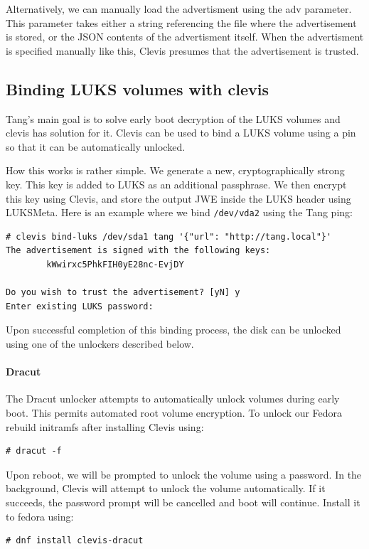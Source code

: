 Alternatively, we can manually load the advertisment using the adv parameter.
This parameter takes either a string referencing the file where the advertisement is stored, or the JSON contents of the advertisment itself.
When the advertisment is specified manually like this, Clevis presumes that the advertisement is trusted.



\subsection{Binding LUKS volumes with clevis}\label{dracut}
Tang's main goal is to solve early boot decryption of the LUKS volumes and clevis has solution for it.
Clevis can be used to bind a LUKS volume using a pin so that it can be automatically unlocked.

How this works is rather simple. We generate a new, cryptographically strong key.
This key is added to LUKS as an additional passphrase.
We then encrypt this key using Clevis, and store the output JWE inside the LUKS header using LUKSMeta.
Here is an example where we bind {\tt /dev/vda2} using the Tang ping:
\begin{lstlisting}[columns=fixed,basicstyle=\ttfamily\footnotesize,tabsize=4,backgroundcolor=\color{yellow!10}]
# clevis bind-luks /dev/sda1 tang '{"url": "http://tang.local"}'
The advertisement is signed with the following keys:
        kWwirxc5PhkFIH0yE28nc-EvjDY

Do you wish to trust the advertisement? [yN] y
Enter existing LUKS password:
\end{lstlisting}

Upon successful completion of this binding process, the disk can be unlocked using one of the unlockers described below.


\paragraph{Dracut}\label{dracut}
The Dracut unlocker attempts to automatically unlock volumes during early boot.
This permits automated root volume encryption.
To unlock our Fedora rebuild initramfs after installing Clevis using:

\begin{lstlisting}[columns=fixed,basicstyle=\ttfamily\footnotesize,tabsize=4,backgroundcolor=\color{yellow!10}]
# dracut -f
\end{lstlisting}
Upon reboot, we will be prompted to unlock the volume using a password.
In the background, Clevis will attempt to unlock the volume automatically.
If it succeeds, the password prompt will be cancelled and boot will continue.
Install it to fedora using:
\begin{lstlisting}[columns=fixed,basicstyle=\ttfamily\footnotesize,tabsize=4,backgroundcolor=\color{yellow!10}]
# dnf install clevis-dracut
\end{lstlisting}
